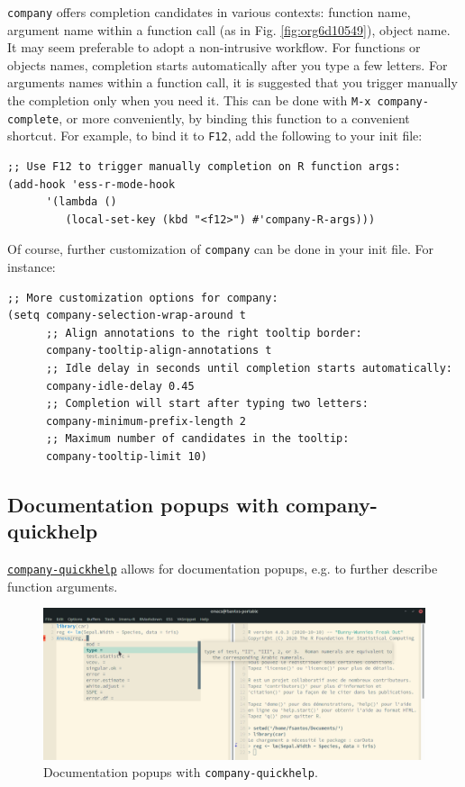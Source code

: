 \documentclass[11pt]{article}
\begin{document}
\texttt{company} offers completion candidates in various contexts: function name, argument name within a function call (as in Fig. \ref{fig:org6d10549}), object name. It may seem preferable to adopt a non-intrusive workflow. For functions or objects names, completion starts automatically after you type a few letters. For arguments names within a function call, it is suggested that you trigger manually the completion only when you need it. This can be done with \texttt{M-x company-complete}, or more conveniently, by binding this function to a convenient shortcut. For example, to bind it to \texttt{F12}, add the following to your init file:

\begin{verbatim}
;; Use F12 to trigger manually completion on R function args:
(add-hook 'ess-r-mode-hook
	  '(lambda ()
	     (local-set-key (kbd "<f12>") #'company-R-args)))
\end{verbatim}

\pagebreak

Of course, further customization of \texttt{company} can be done in your init file. For instance:

\begin{verbatim}
;; More customization options for company:
(setq company-selection-wrap-around t
      ;; Align annotations to the right tooltip border:
      company-tooltip-align-annotations t
      ;; Idle delay in seconds until completion starts automatically:
      company-idle-delay 0.45
      ;; Completion will start after typing two letters:
      company-minimum-prefix-length 2
      ;; Maximum number of candidates in the tooltip:
      company-tooltip-limit 10)
\end{verbatim}

\subsection{Documentation popups with company-quickhelp}
\label{sec:org1dcae15}
\href{https://github.com/company-mode/company-quickhelp}{\texttt{company-quickhelp}} allows for documentation popups, e.g. to further describe function arguments.

\begin{figure}[htbp]
\centering
\includegraphics[width=\textwidth]{./images/company-quickhelp.png}
\caption{Documentation popups with \texttt{company-quickhelp}.}
\end{figure}
\end{document}

